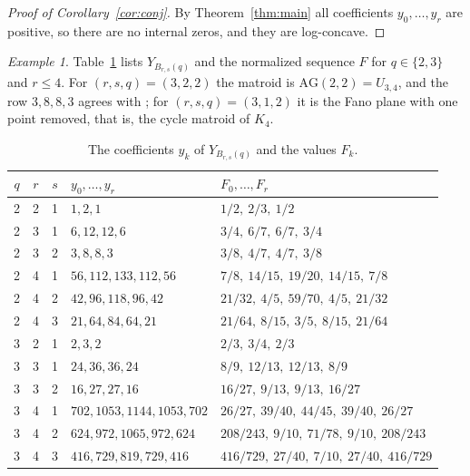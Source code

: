 \documentclass{amsart}
\theoremstyle{remark}
\newtheorem{example}[theorem]{Example}
\numberwithin{equation}{section}
\newcommand{\AG}{\mathrm{AG}}
\begin{document}
\begin{proof}[Proof of Corollary~\ref{cor:conj}]
By Theorem~\ref{thm:main} all coefficients $y_0,\dots,y_r$ are positive, so there are no internal zeros, and they are log-concave.
\end{proof}

\begin{example}
Table~\ref{tab:examples} lists $Y_{B_{r,s}(q)}$ and the normalized sequence $F$ for $q\in\{2,3\}$ and $r\le4$. For $(r,s,q)=(3,2,2)$ the matroid is $\AG(2,2)=U_{3,4}$, and the row $3,8,8,3$ agrees with \cite[Theorem~1.1]{GRX}; for $(r,s,q)=(3,1,2)$ it is the Fano plane with one point removed, that is, the cycle matroid of $K_4$.
\end{example}

\begin{table}[ht]
\centering
\small
\caption{The coefficients $y_k$ of $Y_{B_{r,s}(q)}$ and the values $F_k$.}\label{tab:examples}
\renewcommand{\arraystretch}{1.05}
\begin{tabular}{cccll}
\toprule
$q$ & $r$ & $s$ & $y_0,\dots,y_r$ & $F_0,\dots,F_r$\\
\midrule
2 & 2 & 1 & $1,2,1$ & $1/2,\ 2/3,\ 1/2$\\
2 & 3 & 1 & $6,12,12,6$ & $3/4,\ 6/7,\ 6/7,\ 3/4$\\
2 & 3 & 2 & $3,8,8,3$ & $3/8,\ 4/7,\ 4/7,\ 3/8$\\
2 & 4 & 1 & $56,112,133,112,56$ & $7/8,\ 14/15,\ 19/20,\ 14/15,\ 7/8$\\
2 & 4 & 2 & $42,96,118,96,42$ & $21/32,\ 4/5,\ 59/70,\ 4/5,\ 21/32$\\
2 & 4 & 3 & $21,64,84,64,21$ & $21/64,\ 8/15,\ 3/5,\ 8/15,\ 21/64$\\
\midrule
3 & 2 & 1 & $2,3,2$ & $2/3,\ 3/4,\ 2/3$\\
3 & 3 & 1 & $24,36,36,24$ & $8/9,\ 12/13,\ 12/13,\ 8/9$\\
3 & 3 & 2 & $16,27,27,16$ & $16/27,\ 9/13,\ 9/13,\ 16/27$\\
3 & 4 & 1 & $702,1053,1144,1053,702$ & $26/27,\ 39/40,\ 44/45,\ 39/40,\ 26/27$\\
3 & 4 & 2 & $624,972,1065,972,624$ & $208/243,\ 9/10,\ 71/78,\ 9/10,\ 208/243$\\
3 & 4 & 3 & $416,729,819,729,416$ & $416/729,\ 27/40,\ 7/10,\ 27/40,\ 416/729$\\
\bottomrule
\end{tabular}
\end{table}
\end{document}
